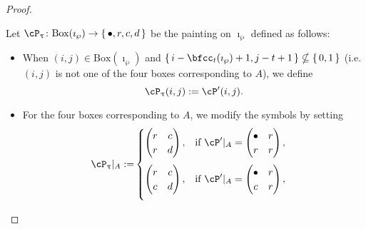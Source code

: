 \documentclass[12pt,a4paper]{amsart}
\numberwithin{equation}{section}
\theoremstyle{remark}
\def\BOX#1{\mathrm{Box}(#1)}
\begin{document}
{\begin{proof}
\begin{description}
    Let $\cP_{\uptau}\colon \BOX{\imath_{\wp}}\rightarrow \set{\bullet,r,c,d}$
          be the painting on $\imath_{\wp}$ defined as follows:
          \begin{itemize}
            \item When $(i,j)\in \BOX{\imath_{\wp}}$ and
            $\set{i-\bfcc_{t}(\imath_{\wp})+1, j-t+1}\nsubseteq \set{0,1}$
            (i.e. $(i,j)$ is not one of the four boxes corresponding to
            $A$), we define
            \[
              \cP_{\uptau}(i,j):= \cP'(i,j).
            \]

            \item For the four boxes corresponding to $A$, we modify the symbols by
            setting
            \begin{equation} \label{eq:modP}
              \begin{split}
              \cP_{\uptau}|_A  :=&
                \begin{cases}
                  \begin{pmatrix}
                    r & c\\
                    r & d
                  \end{pmatrix}, & \text{if } \cP'|_A =
                  \begin{pmatrix}
                    \bullet & r\\
                    r & r
                  \end{pmatrix},\\[1.5em]
                  \begin{pmatrix}
                    r & c\\
                    c & d
                  \end{pmatrix}, & \text{if } \cP'|_A =
                  \begin{pmatrix}
                    \bullet & r\\
                    c & r
                  \end{pmatrix},\\[1.5em]

\end{cases}
\end{split}
\end{equation}
\end{itemize}
\end{description}
\end{proof}}
\end{document}
